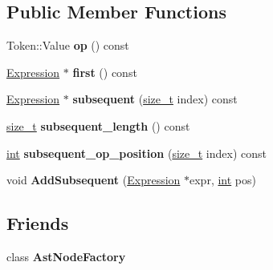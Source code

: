 \subsection*{Public Member Functions}
\begin{DoxyCompactItemize}
\item 
\mbox{\label{classv8_1_1internal_1_1NaryOperation_a8627a1d618a5aa02cb77b330f37d79fe}} 
Token\+::\+Value {\bfseries op} () const
\item 
\mbox{\label{classv8_1_1internal_1_1NaryOperation_a20a7ae99d07a63825197fcd103a691d3}} 
\mbox{\hyperlink{classv8_1_1internal_1_1Expression}{Expression}} $\ast$ {\bfseries first} () const
\item 
\mbox{\label{classv8_1_1internal_1_1NaryOperation_add359936d60c3da2f5bc797dcc4fe80a}} 
\mbox{\hyperlink{classv8_1_1internal_1_1Expression}{Expression}} $\ast$ {\bfseries subsequent} (\mbox{\hyperlink{classsize__t}{size\+\_\+t}} index) const
\item 
\mbox{\label{classv8_1_1internal_1_1NaryOperation_aec7a1761ba5aebbd99ff8d4b93bf6110}} 
\mbox{\hyperlink{classsize__t}{size\+\_\+t}} {\bfseries subsequent\+\_\+length} () const
\item 
\mbox{\label{classv8_1_1internal_1_1NaryOperation_a1db89ef63107d34c554a8ccd4d8c01bc}} 
\mbox{\hyperlink{classint}{int}} {\bfseries subsequent\+\_\+op\+\_\+position} (\mbox{\hyperlink{classsize__t}{size\+\_\+t}} index) const
\item 
\mbox{\label{classv8_1_1internal_1_1NaryOperation_a7ba6ffeec4b7faa920a8be512a5e37eb}} 
void {\bfseries Add\+Subsequent} (\mbox{\hyperlink{classv8_1_1internal_1_1Expression}{Expression}} $\ast$expr, \mbox{\hyperlink{classint}{int}} pos)
\end{DoxyCompactItemize}
\subsection*{Friends}
\begin{DoxyCompactItemize}
\item 
\mbox{\label{classv8_1_1internal_1_1NaryOperation_a8d587c8ad3515ff6433eb83c578e795f}} 
class {\bfseries Ast\+Node\+Factory}
\end{DoxyCompactItemize}
